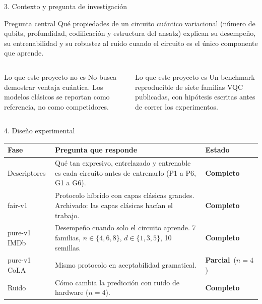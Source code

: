 \documentclass[aspectratio=169,10pt]{beamer}
\newcommand{\ok}{\textcolor{verde}{\textbf{Completo}}}
\newcommand{\inc}{\textcolor{ambar!80!black}{\textbf{Parcial}}}
\begin{document}
\begin{frame}{3. Contexto y pregunta de investigación}
\begin{azulbox}{Pregunta central}
Qué propiedades de un circuito cuántico variacional (número de qubits, profundidad, codificación y estructura del ansatz) explican su desempeño, su entrenabilidad y su robustez al ruido cuando el circuito es el único componente que aprende.
\end{azulbox}
\begin{columns}[T]
\begin{verdebox}{Lo que este proyecto no es}
No busca demostrar ventaja cuántica. Los modelos clásicos se reportan como referencia, no como competidores.
\end{verdebox}
\begin{ambarbox}{Lo que este proyecto es}
Un benchmark reproducible de siete familias VQC publicadas, con hipótesis escritas antes de correr los experimentos.
\end{ambarbox}
\end{columns}
\end{frame}

\begin{frame}{4. Diseño experimental}
\small
\begin{tabularx}{\textwidth}{@{}lXl@{}}
\toprule
\textbf{Fase} & \textbf{Pregunta que responde} & \textbf{Estado}\\
\midrule
Descriptores & Qué tan expresivo, entrelazado y entrenable es cada circuito antes de entrenarlo (P1 a P6, G1 a G6). & \ok\\
fair-v1 & Protocolo híbrido con capas clásicas grandes. Archivado: las capas clásicas hacían el trabajo. & \ok\\
pure-v1 IMDb & Desempeño cuando solo el circuito aprende. 7 familias, $n\in\{4,6,8\}$, $d\in\{1,3,5\}$, 10 semillas. & \ok\\
pure-v1 CoLA & Mismo protocolo en aceptabilidad gramatical. & \inc\ ($n=4$)\\
Ruido & Cómo cambia la predicción con ruido de hardware ($n=4$). & \ok\\
\bottomrule
\end{tabularx}
\end{frame}
\end{document}
